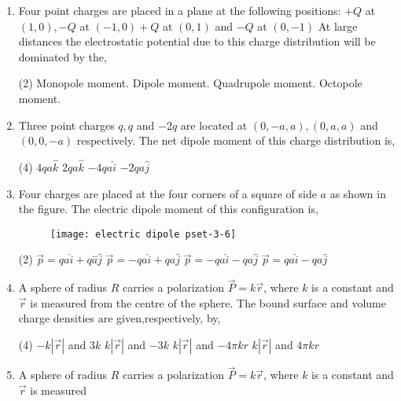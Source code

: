 \begin{enumerate} [label=\color{ocre}\textbf{\arabic*.}]
	\item  Four point charges are placed in a plane at the following positions:
	$+Q$ at $(1,0),-Q$ at $(-1,0)+Q$ at $(0,1)$ and $-Q$ at $(0,-1)$
	At large distances the electrostatic potential due to this charge distribution will be dominated by the,
	\begin{tasks}(2)
		\task[\textbf{a.}]Monopole moment.  
		\task[\textbf{b.}]Dipole moment.
		\task[\textbf{c.}]Quadrupole moment. 
		\task[\textbf{d.}]Octopole moment. 
	\end{tasks}
\item Three point charges $q, q$ and $-2 q$ are located at $(0,-a, a),(0, a, a)$ and $(0,0,-a)$ respectively.
The net dipole moment of this charge distribution is,
\begin{tasks}(4)
	\task[\textbf{a.}] $4 q a \hat{k}$  
	\task[\textbf{b.}]$2 q a \hat{k}$
	\task[\textbf{c.}] $-4 q a \hat{i}$
	\task[\textbf{d.}]$-2 q a \hat{j}$ 
\end{tasks}
\item Four charges are placed at the four corners of a square of side $a$ as shown in the figure. The electric dipole moment of this configuration is,
\begin{figure}[H]
	\begin{center}
		\texttt{[image: electric dipole pset-3-6]}
	\end{center}
\end{figure}
\begin{tasks}(2)
	\task[\textbf{a.}] $\vec{p}=q a \hat{i}+q \hat{a} \hat{j}$  
	\task[\textbf{b.}]$\vec{p}=-q a \hat{i}+q a \hat{j}$
	\task[\textbf{c.}]$\vec{p}=-q a \hat{i}-q a \hat{j}$ 
	\task[\textbf{d.}]$\vec{p}=q a \hat{i}-q a \hat{j}$	  
\end{tasks}
\item A sphere of radius $R$ carries a polarization $\vec{P}=k \vec{r}$, where $k$ is a constant and $\vec{r}$ is measured
from the centre of the sphere. The bound surface and volume charge densities are given,respectively, by,
\begin{tasks}(4)
	\task[\textbf{a.}] $-k|\vec{r}|$ and $3 k$  
	\task[\textbf{b.}]$k|\vec{r}|$ and $-3 k$
	\task[\textbf{c.}] $k|\vec{r}|$ and $-4 \pi k r$
	\task[\textbf{d.}]  $k|\vec{r}|$ and $4 \pi k r$
\end{tasks}
\item A sphere of radius $R$ carries a polarization $\vec{P}=k \vec{r}$, where $k$ is a constant and $\vec{r}$ is measured

\end{enumerate}
